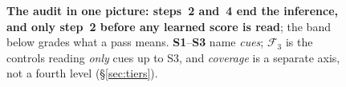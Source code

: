 \begin{figure}[t]
\caption{\textbf{The audit in one picture: steps~2 and~4 end the inference, and only step~2 before any
learned score is read}; the band below grades what a pass means. \textbf{S1}--\textbf{S3} name
\emph{cues}; $\mathcal{F}_3$ is the controls reading \emph{only} cues up to S3, and \emph{coverage} is a
separate axis, not a fourth level (\S\ref{sec:tiers}).}
\label{fig:audit}
\end{figure}
